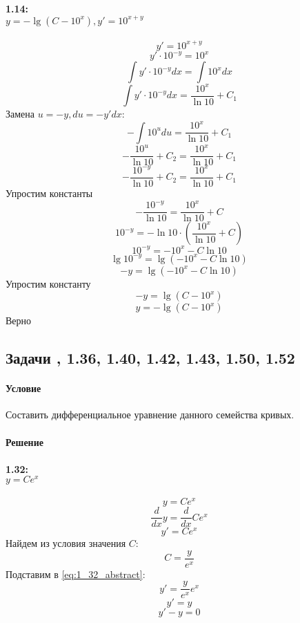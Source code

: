 \paragraph{1.14:\\ $y = -\lg(C - 10^x), y' = 10^{x + y}$}
\[y' = 10^{x + y}\]
\[y'\cdot10^{-y} = 10^x\]
\[\int y'\cdot10^{-y}dx = \int10^xdx\]
\[\int y'\cdot10^{-y}dx = \frac{10^x}{\ln 10} + C_1\]
Замена $u = -y, du = -y'dx$:
\[-\int 10^udu = \frac{10^x}{\ln 10} + C_1\]
\[-\frac{10^u}{\ln 10} + C_2 = \frac{10^x}{\ln 10} + C_1\]
\[-\frac{10^{-y}}{\ln 10} + C_2 = \frac{10^x}{\ln 10} + C_1\]
Упростим константы
\[-\frac{10^{-y}}{\ln 10} = \frac{10^x}{\ln 10} + C\]
\[10^{-y} = -\ln 10 \cdot \left(\frac{10^x}{\ln 10} + C\right)\]
\[10^{-y} = -10^x - C\ln 10\]
\[\lg{10^{-y}} = \lg(-10^x - C\ln 10)\]
\[-y = \lg(-10^x - C\ln 10)\]
Упростим константу
\[-y = \lg(C - 10^x)\]
\[y = -\lg(C - 10^x)\]
Верно

\subsection{Задачи , 1.36, 1.40, 1.42, 1.43, 1.50, 1.52}
\paragraph{Условие}
Составить дифференциальное уравнение данного семейства кривых.
\paragraph{Решение}
\paragraph{1.32:\\ $y = Ce^x$}
\[y = Ce^x\]
\[\frac{d}{dx}y = \frac{d}{dx}Ce^x\]
\begin{equation}
  y' = Ce^x
  \label{eq:1_32_abstract}
\end{equation}
Найдем из условия значения $C$:
\[C = \frac{y}{e^x}\]
Подставим в \ref{eq:1_32_abstract}:
\[y' = \frac{y}{e^x}e^x\]
\[y' = y\]
\[y' - y = 0\]

